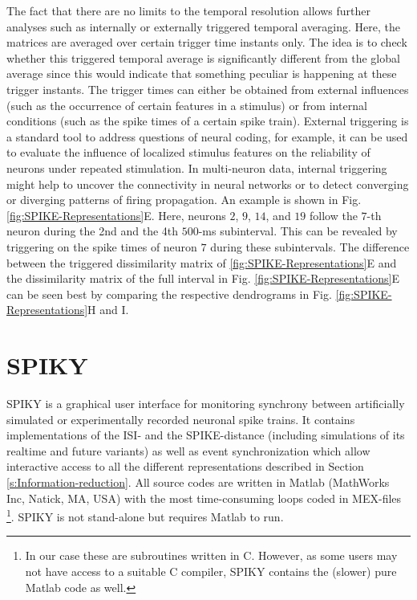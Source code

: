 \documentclass[10pt,twocolumn]{elsart5p}
\begin{document}
The fact that there are no limits to the temporal resolution allows further analyses such as internally or externally triggered temporal averaging. Here, the matrices are averaged over certain trigger time instants only. The idea is to check whether this triggered temporal average is significantly different from the global average since this would indicate that something peculiar is happening at these trigger instants. The trigger times can either be obtained from external influences (such as the occurrence of certain features in a stimulus) or from internal conditions (such as the spike times of a certain spike train). External triggering is a standard tool to address questions of neural coding, for example, it can be used to evaluate the influence of localized stimulus features on the reliability of neurons under repeated stimulation. In multi-neuron data, internal triggering might help to uncover the connectivity in neural networks or to detect converging or diverging patterns of firing propagation. An example is shown in Fig. \ref{fig:SPIKE-Representations}E. Here, neurons $2$, $9$, $14$, and $19$ follow the $7$-th neuron during the 2nd and the 4th $500$-ms subinterval. This can be revealed by triggering on the spike times of neuron $7$ during these subintervals. The difference between the triggered dissimilarity matrix of \ref{fig:SPIKE-Representations}E and the dissimilarity matrix of the full interval in Fig. \ref{fig:SPIKE-Representations}E can be seen best by comparing the respective dendrograms in Fig. \ref{fig:SPIKE-Representations}H and I.

%
%
\section{\label{s:SPIKY} SPIKY}

SPIKY is a graphical user interface for monitoring synchrony between artificially simulated or experimentally recorded neuronal spike trains. It contains implementations of the ISI- and the SPIKE-distance (including simulations of its realtime and future variants) as well as event synchronization which allow interactive access to all the different representations described in Section \ref{s:Information-reduction}. All source codes are written in Matlab (MathWorks Inc, Natick, MA, USA) with the most time-consuming loops coded in MEX-files \footnote{In our case these are subroutines written in C. However, as some users may not have access to a suitable C compiler, SPIKY contains the (slower) pure Matlab code as well.}. SPIKY is not stand-alone but requires Matlab to run.
\end{document}
